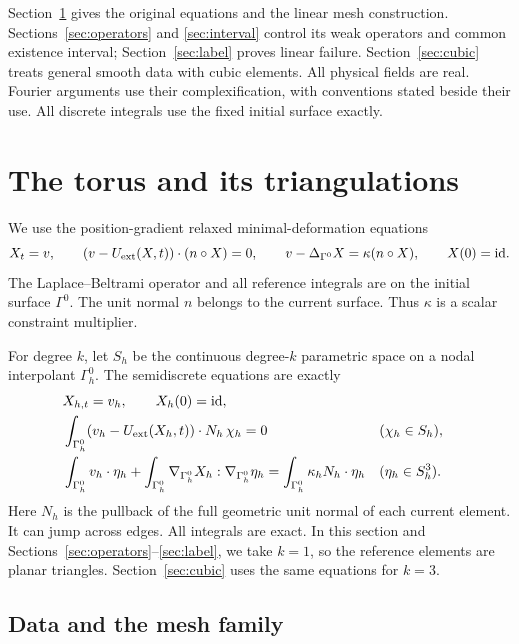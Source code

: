 \documentclass[11pt,a4paper]{article}
\numberwithin{equation}{section}
\theoremstyle{remark}
\newcommand{\id}{\mathrm{id}}
\begin{document}
Section~\ref{sec:mesh} gives the original equations and the linear mesh
construction. Sections~\ref{sec:operators} and \ref{sec:interval}
control its weak operators and common existence interval;
Section~\ref{sec:label} proves linear failure.
Section~\ref{sec:cubic} treats general smooth data with cubic elements.
All physical fields are real. Fourier arguments use their
complexification, with conventions stated beside their use.
All discrete integrals use the fixed initial surface exactly.

\section{The torus and its triangulations}\label{sec:mesh}

We use the position-gradient relaxed minimal-deformation equations
\begin{equation}\label{eq:continuous}
 X_t=v,\qquad
 (v-U_{\rm ext}(X,t))\cdot(n\circ X)=0,\qquad
 v-\Delta_{\Gamma^0}X=\kappa(n\circ X),\qquad X(0)=\id .
\end{equation}
The Laplace--Beltrami operator and all reference integrals are on the
initial surface \(\Gamma^0\). The unit normal \(n\) belongs to the current
surface. Thus \(\kappa\) is a scalar constraint multiplier.

For degree \(k\), let \(S_h\) be the continuous degree-\(k\) parametric
space on a nodal interpolant \(\Gamma_h^0\). The semidiscrete equations are exactly
\begin{align}
 &X_{h,t}=v_h,\qquad X_h(0)=\id,\label{eq:discrete-time}\\
 &\int_{\Gamma_h^0}(v_h-U_{\rm ext}(X_h,t))\cdot N_h\,\chi_h=0
       &&(\chi_h\in S_h),\label{eq:discrete-normal}\\
 &\int_{\Gamma_h^0}v_h\cdot\eta_h+
       \int_{\Gamma_h^0}\nabla_{\Gamma_h^0}X_h:
                         \nabla_{\Gamma_h^0}\eta_h
       =\int_{\Gamma_h^0}\kappa_h N_h\cdot\eta_h
       &&(\eta_h\in S_h^3).\label{eq:discrete-force}
\end{align}
Here \(N_h\) is the pullback of the full geometric unit normal of each
current element. It can jump across edges. All integrals are exact.
In this section and Sections~\ref{sec:operators}--\ref{sec:label},
we take \(k=1\), so the reference elements are planar triangles.
Section~\ref{sec:cubic} uses the same equations for \(k=3\).

\subsection{Data and the mesh family}
\end{document}
